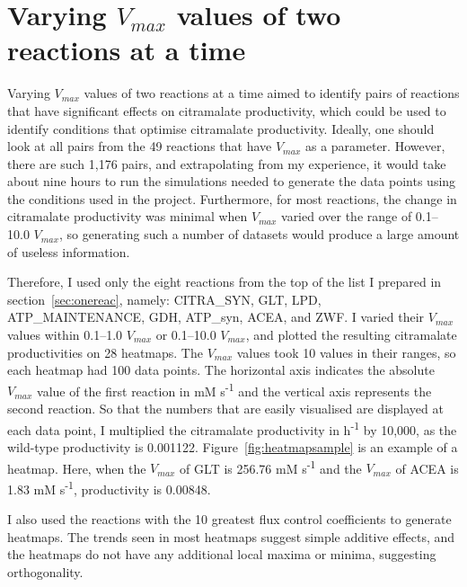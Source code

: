 \documentclass[parskip=full]{scrreprt}
\begin{document}
\section{Varying $V_{max}$ values of two reactions at a time}
\label{sec:couples}

Varying $V_{max}$ values of two reactions at a time aimed to identify pairs of reactions that have significant effects on citramalate productivity, which could be used to identify conditions that optimise citramalate productivity. Ideally, one should look at all pairs from the 49 reactions that have $V_{max}$ as a parameter. However, there are such 1,176 pairs, and extrapolating from my experience, it would take about nine hours to run the simulations needed to generate the data points using the conditions used in the project. Furthermore, for most reactions, the change in citramalate productivity was minimal when $V_{max}$ varied over the range of 0.1--10.0 $V_{max}$, so generating such a number of datasets would produce a large amount of useless information.

Therefore, I used only the eight reactions from the top of the list I prepared in section~\ref{sec:onereac}, namely:  CITRA\_SYN, GLT, LPD, ATP\_MAINTENANCE, GDH, ATP\_syn, ACEA, and ZWF. I varied their $V_{max}$ values within 0.1--1.0 $V_{max}$ or 0.1--10.0 $V_{max}$, and plotted the resulting citramalate productivities on 28 heatmaps. The $V_{max}$ values took 10 values in their ranges, so each heatmap had 100 data points. The horizontal axis indicates the absolute $V_{max}$ value of the first reaction in mM s\textsuperscript{-1} and the vertical axis represents the second reaction. So that the numbers that are easily visualised are displayed at each data point, I multiplied the citramalate productivity in h\textsuperscript{-1} by 10,000, as the wild-type productivity is 0.001122. Figure~\ref{fig:heatmapsample} is an example of a heatmap. Here, when the $V_{max}$ of GLT is 256.76 mM s\textsuperscript{-1} and the $V_{max}$ of ACEA is 1.83 mM s\textsuperscript{-1}, productivity is 0.00848.

I also used the reactions with the 10 greatest flux control coefficients to generate heatmaps. The trends seen in most heatmaps suggest simple additive effects, and the heatmaps do not have any additional local maxima or minima, suggesting orthogonality.
\end{document}

